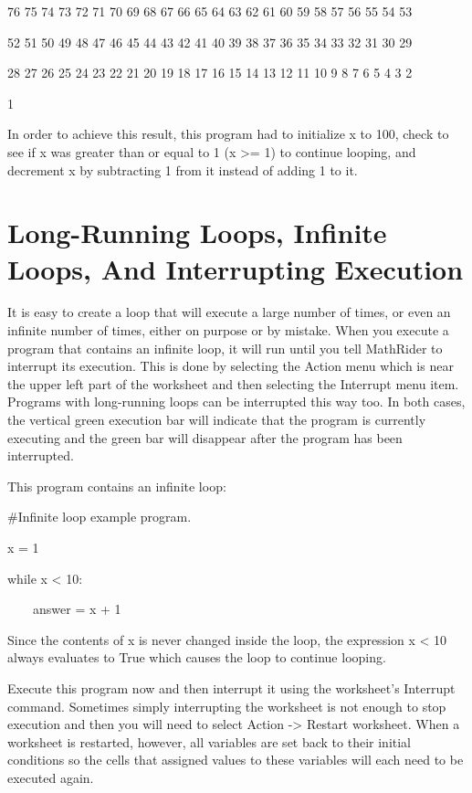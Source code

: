 \documentclass[12pt,oneside]{book}
\begin{document}
76 75 74 73 72 71 70 69 68 67 66 65 64 63 62 61 60 59 58 57 56 55 54 53

52 51 50 49 48 47 46 45 44 43 42 41 40 39 38 37 36 35 34 33 32 31 30 29

28 27 26 25 24 23 22 21 20 19 18 17 16 15 14 13 12 11 10 9 8 7 6 5 4 3 2

1 


In order to achieve this result, this program had to initialize x to 100, check to see if x was greater than or equal to 1 (x {\textgreater}= 1) to continue looping, and decrement x by subtracting 1 from it instead of adding 1 to it.

\section[Long-Running Loops, Infinite Loops, And Interrupting Execution]{ Long-Running Loops, Infinite Loops, And Interrupting Execution}

It is easy to create a loop that will execute a large number of times, or even an infinite number of times, either on purpose or by mistake. When you execute a program that contains an infinite loop, it will run until you tell MathRider to interrupt its execution. This is done by selecting the Action menu which is near the upper left part of the worksheet and then selecting the Interrupt menu item. Programs with long{}-running loops can be interrupted this way too. In both cases, the vertical green execution bar will indicate that the program is currently executing and the green bar will disappear after the program has been interrupted. 


This program contains an infinite loop:


\#Infinite loop example program.


x = 1

while x {\textless} 10:

\ \ \ \ answer = x + 1

{\textbar}


Since the contents of x is never changed inside the loop, the expression x {\textless} 10 always evaluates to True which causes the loop to continue looping. 

Execute this program now and then interrupt it using the worksheet's Interrupt command. Sometimes simply interrupting the worksheet is not enough to stop execution and then you will need to select Action {}-{\textgreater} Restart worksheet. When a worksheet is restarted, however, all variables are set back to their initial conditions so the cells that assigned values to these variables will each need to be executed again. 
\end{document}
